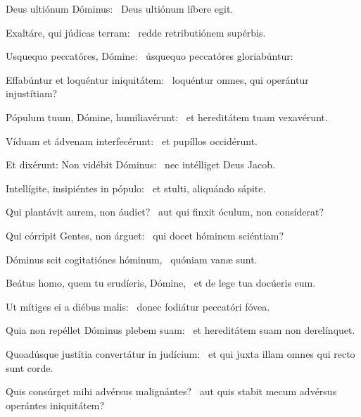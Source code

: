 \item Deus ultiónum Dóminus:~\psstar{} Deus ultiónum líbere egit.

\item Exaltáre, qui júdicas terram:~\psstar{} redde retributiónem supérbis.

\item Usquequo peccatóres, Dómine:~\psstar{} úsquequo peccatóres gloriabúntur:

\item Effabúntur et loquéntur iniquitátem:~\psstar{} loquéntur omnes, qui operántur injustítiam?

\item Pópulum tuum, Dómine, humiliavérunt:~\psstar{} et hereditátem tuam vexavérunt.

\item Víduam et ádvenam interfe\-cérunt:~\psstar{} et pupíllos occidérunt.

\item Et dixérunt: Non vidébit Dóminus:~\psstar{} nec intélliget Deus Jacob.

\item Intellígite, insipiéntes in pópulo:~\psstar{} et stulti, aliquándo sápite.

\item Qui plantávit aurem, non áudiet?~\psstar{} aut qui finxit óculum, non consíderat?

\item Qui córripit Gentes, non árguet:~\psstar{} qui docet hóminem sciéntiam?

\item Dóminus scit cogitatiónes hóminum,~\psstar{} quóniam vanæ sunt.

\item Beátus homo, quem tu erudíeris, Dómine,~\psstar{} et de lege tua docúeris eum.

\item Ut mítiges ei a diébus malis:~\psstar{} donec fodiátur peccatóri fóvea.

\item Quia non repéllet Dóminus plebem suam:~\psstar{} et hereditátem suam non derelínquet.

\item Quoadúsque justítia convertátur in judícium:~\psstar{} et qui juxta illam omnes qui recto sunt corde.

\item Quis consúrget mihi advérsus malignántes?~\psstar{} aut quis stabit mecum advérsus operántes iniquitátem?

